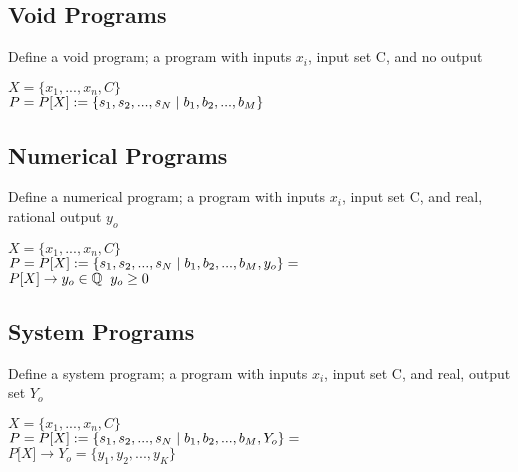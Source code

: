 \documentclass[11pt]{article}
\begin{document}
\subsection{Void Programs}
Define a void program; a program with inputs $x_i$, input set C, and no output
\begin{center}
$
X = \{x_1,...,x_n,C\}
$
\\ \vspace{2mm}
$P = P\lbrack X \rbrack := \{ s_1,s_2,...,s_{N}\hspace{1mm}|\hspace{1mm} b_1, b_2,...,b_M\}$
\end{center}





\subsection{Numerical Programs}
Define a numerical program; a program with inputs $x_i$, input set C, and real, rational output $y_o$
\begin{center}
$
X = \{x_1,...,x_n,C\}
$
\\ \vspace{2mm}
$P = P\lbrack X \rbrack := \{ s_1,s_2,...,s_{N}\hspace{1mm}|\hspace{1mm} b_1, b_2,...,b_M,y_o\}=$
\\ \vspace{2mm}
$
P\lbrack X \rbrack \rightarrow y_o \in \mathbb{Q} \hspace{2mm} y_o \geq 0
$
\end{center}





\subsection{System Programs}
Define a system program; a program with inputs $x_i$, input set C, and real, output set $Y_o$
\begin{center}
$
X = \{x_1,...,x_n,C\}
$
\\ \vspace{2mm}
$P = P\lbrack X \rbrack := \{ s_1,s_2,...,s_{N}\hspace{1mm}|\hspace{1mm} b_1, b_2,...,b_M,Y_o\}=$
\\ \vspace{2mm}
$
P\lbrack X \rbrack \rightarrow Y_o = \{y_1,y_2,...,y_K\}
$
\end{center}
\end{document}
